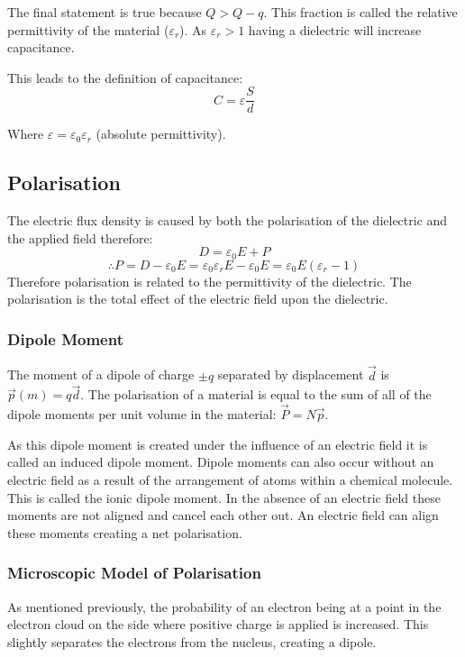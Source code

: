 \documentclass[11pt,a4paper]{report}
\begin{document}
The final statement is true because $Q > Q-q$. This fraction is called the relative permittivity of the material ($\varepsilon_r$). As $\varepsilon_r > 1$ having a dielectric will increase capacitance. 

This leads to the definition of capacitance:
\begin{equation*}
	C = \varepsilon \frac{S}{d}
\end{equation*}

Where $\varepsilon = \varepsilon_0\varepsilon_r$ (absolute permittivity).

\subsection{Polarisation}
The electric flux density is caused by both the polarisation of the dielectric and the applied field therefore:
\begin{equation*}
	D = \varepsilon_0E + P
\end{equation*}
\begin{equation*}
	\therefore P = D-\varepsilon_0E = \varepsilon_0\varepsilon_rE - \varepsilon_0E = \varepsilon_0E(\varepsilon_r-1)
\end{equation*}
Therefore polarisation is related to the permittivity of the dielectric. The polarisation is the total effect of the electric field upon the dielectric. 

\subsubsection{Dipole Moment}
The moment of a dipole of charge $\pm q$ separated by displacement $\vec{d}$ is $\vec{p}(m) = q\vec{d}$. The polarisation of a material is equal to the sum of all of the dipole moments per unit volume in the material: $\vec{P} = N\vec{p}$.

As this dipole moment is created under the influence of an electric field it is called an induced dipole moment. Dipole moments can also occur without an electric field as a result of the arrangement of atoms within a chemical molecule. This is called the ionic dipole moment. In the absence of an electric field these moments are not aligned and cancel each other out. An electric field can align these moments creating a net polarisation.

\subsubsection{Microscopic Model of Polarisation}
As mentioned previously, the probability of an electron being at a point in the electron cloud on the side where positive charge is applied is increased. This slightly separates the electrons from the nucleus, creating a dipole.
\end{document}
